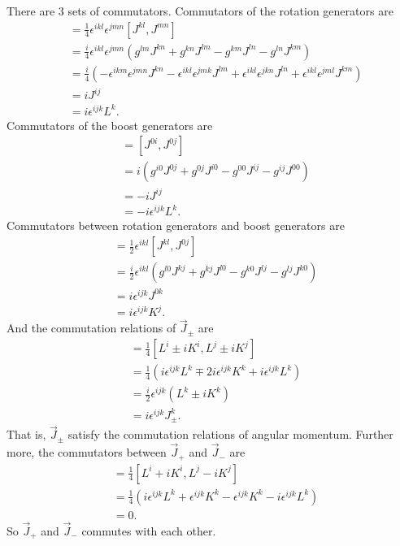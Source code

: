 \solution
\begin{problembody}
    \item There are 3 sets of commutators. Commutators of the rotation generators are
    \begin{align*}
        [L^i, L^j] & = \frac{1}{4} \epsilon^{ikl} \epsilon^{jmn} [J^{kl}, J^{mn}]\\
        & = \frac{i}{4} \epsilon^{ikl} \epsilon^{jmn} \left(g^{lm}J^{kn} + g^{kn}J^{lm} - g^{km}J^{ln} - g^{ln}J^{km}\right)\\
        & = \frac{i}{4} \left(-\epsilon^{ikm}\epsilon^{jmn}J^{kn} - \epsilon^{ikl}\epsilon^{jmk}J^{lm} 
        + \epsilon^{ikl}\epsilon^{jkn}J^{ln} + \epsilon^{ikl}\epsilon^{jml}J^{km}\right)\\
        & = i J^{ij}\\
        & = i \epsilon^{ijk} L^k.
    \end{align*}
    Commutators of the boost generators are
    \begin{align*}
        [K^i, K^j] & = [J^{0i}, J^{0j}]\\
        & = i\left(g^{i0}J^{0j} + g^{0j}J^{i0} - g^{00}J^{ij} - g^{ij}J^{00}\right)\\
        & = -iJ^{ij}\\
        & = -i \epsilon^{ijk} L^k.
    \end{align*}
    Commutators between rotation generators and boost generators are
    \begin{align*}
        [L^i, K^j] & = \frac{1}{2} \epsilon^{ikl} [J^{kl}, J^{0j}]\\
        & = \frac{i}{2} \epsilon^{ikl} \left(g^{l0}J^{kj} + g^{kj}J^{l0} - g^{k0}J^{lj} - g^{lj}J^{k0}\right)\\
        & = i\epsilon^{ijk} J^{0k}\\
        & = i\epsilon^{ijk} K^j.
    \end{align*}
    And the commutation relations of $\vec{J}_\pm$ are
    \begin{align*}
        [J^i_\pm, J^j_\pm] & = \frac{1}{4}[L^i \pm iK^i, L^j \pm iK^j]\\
        & = \frac{1}{4} \left(i\epsilon^{ijk}L^k \mp 2i\epsilon^{ijk}K^k + i\epsilon^{ijk}L^k\right)\\
        & = \frac{i}{2} \epsilon^{ijk} \left(L^k \pm iK^k\right)\\
        & = i\epsilon^{ijk} J^k_\pm.
    \end{align*}
    That is, $\vec{J}_\pm$ satisfy the commutation relations of angular momentum. Further more, the commutators between 
    $\vec{J}_+$ and $\vec{J}_-$ are
    \begin{align*}
        [J^i_+, J^j_-] & = \frac{1}{4} [L^i + iK^i, L^j - iK^j]\\
        & = \frac{1}{4} \left(i\epsilon^{ijk}L^k + \epsilon^{ijk}K^k - \epsilon^{ijk}K^k -i\epsilon^{ijk}L^k\right)\\
        & = 0.
    \end{align*}
    So $\vec{J}_+$ and $\vec{J}_-$ commutes with each other.


\end{problembody}
